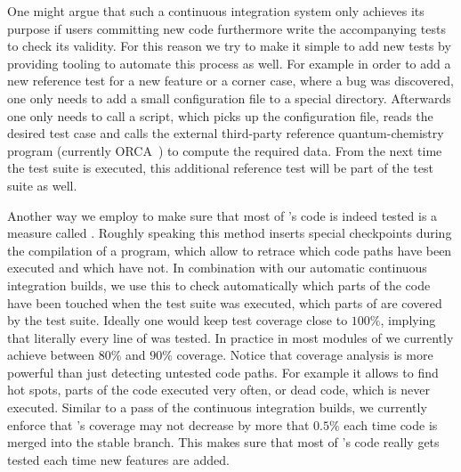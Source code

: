One might argue that such a continuous integration system only
achieves its purpose if users committing new code
furthermore write the accompanying tests to check its validity.
For this reason we try to make it simple to add new tests
by providing tooling to automate this process as well.
For example in order to add a new reference test for a new feature
or a corner case, where a bug was discovered,
one only needs to add a small configuration file to a special directory.
Afterwards one only needs to call a \python script,
which picks up the configuration file,
reads the desired test case and calls the external third-party reference
quantum-chemistry program (currently ORCA~\cite{ORCA})
to compute the required data.
From the next time the \molsturm test suite is executed,
this additional reference test will be part of the test suite as well.

Another way we employ to make sure that most of \molsturm's code
is indeed tested
is a measure called .
Roughly speaking this method inserts special checkpoints during the compilation
of a program,
which allow to retrace which code paths have been executed
and which have not.
In combination with our automatic continuous integration builds,
we use this to check automatically which parts of the code have been touched
when the test suite was executed,
\ie which parts of \molsturm are covered by the test suite.
Ideally one would keep test coverage close to $100\%$,
implying that literally every line of \molsturm was tested.
In practice in most modules of \molsturm we currently achieve
between $80\%$ and $90\%$ coverage.
Notice that coverage analysis is more powerful than just detecting
untested code paths.
For example it allows to find hot spots,
\ie parts of the code executed very often,
or dead code, which is never executed.
Similar to a pass of the continuous integration builds,
we currently enforce that \molsturm's coverage may not decrease
by more that $0.5\%$ each time code is merged into the stable branch.
This makes sure that most of \molsturm's code really gets tested
each time new features are added.
